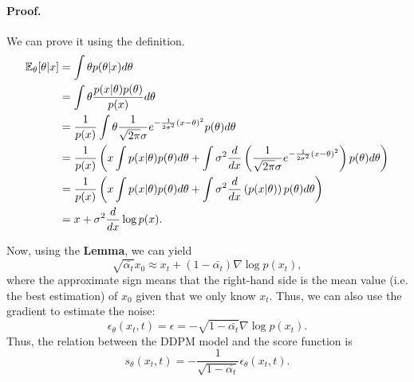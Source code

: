\documentclass[a4 paper,12pt]{article}
\begin{document}
\paragraph*{Proof.} We can prove it using the definition.
\begin{align*}
\mathbb{E}_\theta[\theta|x]&=\int \theta p(\theta|x)d\theta\\
&=\int \theta \frac{p(x|\theta)p(\theta)}{p(x)}d\theta\\
&=\frac{1}{p(x)}\int \theta \frac{1}{\sqrt{2\pi}\sigma}e^{-\frac{1}{2\sigma^2}(x-\theta)^2}p(\theta)d\theta\\
&=\frac{1}{p(x)}\left(x\int p(x|\theta)p(\theta)d\theta+\int \sigma^2\frac{d}{dx}\left(\frac{1}{\sqrt{2\pi}\sigma}e^{-\frac{1}{2\sigma^2}(x-\theta)^2}\right)p(\theta)d\theta\right)\\
&=\frac{1}{p(x)}\left(x\int p(x|\theta)p(\theta)d\theta+\int \sigma^2\frac{d}{dx}\left(p(x|\theta)\right)p(\theta)d\theta\right)\\
&=x+\sigma^2\frac{d}{dx}\log p(x).
\end{align*}

Now, using the \textbf{Lemma}, we can yield
\[
\sqrt{\bar{\alpha_t}}x_0\approx x_t+(1-\bar{\alpha_t})\nabla \log p(x_t),
\] where the approximate sign means that the right-hand side is the mean value (i.e. the best estimation) of $x_0$ given that we only know $x_t$. Thus, we can also use the gradient to estimate the noise:
\[
\epsilon_\theta(x_t,t)=\epsilon=-{\sqrt{1-\bar{\alpha_t}}}\nabla \log p(x_t).	
\]
Thus, the relation between the DDPM model and the score function is
\[
s_\theta(x_t,t)=-\frac{1}{\sqrt{1-\bar{\alpha_t}}}\epsilon_\theta(x_t,t).
\]


\end{document}
